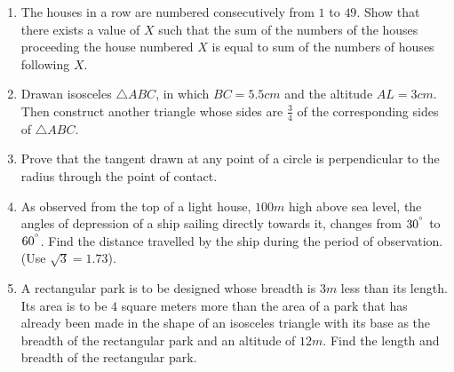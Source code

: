 \documentclass{article}
\begin{document}
\begin{enumerate}
\item The houses in a row are numbered consecutively from $1$ to $49$. Show that there exists a value of $X$ such that the sum of the numbers of the houses proceeding the house numbered $X$ is equal to sum of the numbers of houses following $X$.                                                                                                                                                                

\item Drawan isosceles $\triangle ABC$, in which $BC = 5.5cm$ and the altitude $AL = 3cm$. Then construct another triangle whose sides are $\frac{3}{4}$ of the corresponding sides of $\triangle ABC$.                                                                                             

\item Prove that the tangent drawn at any point of a circle is perpendicular to the radius through the point of contact.                                                                                             

\item As observed from the top of a light house, $100 m$  high above sea level, the angles of depression of a ship sailing directly towards it, changes from $30^{\degree}$ to $60^{\degree}$. Find the distance travelled by the ship during the period of observation. (Use $\sqrt{3} = 1.73$).  

\item A rectangular park is to be designed whose breadth is $3 m$ less than its length. Its area is to be $4$ square meters more than the area of a park that has already been made in the shape of an isosceles triangle with its base as the breadth of the rectangular park and an altitude of $12 m$. Find the length and breadth of the rectangular park.                                                 

\end{enumerate}                                        
\end{document}
